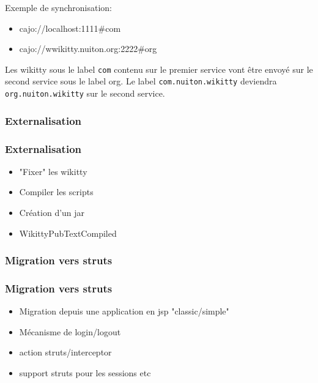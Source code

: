 \documentclass[12pt,a4paper,utf8x]{beamer}
\begin{document}
\begin{frame}
Exemple de synchronisation:
\begin{itemize}
\item cajo://localhost:1111\#com
\item cajo://wwikitty.nuiton.org:2222\#org
\end{itemize}
\vspace{5mm}
Les wikitty sous le label \verb!com! contenu sur le premier service vont
être envoyé sur le second service sous le label org.
\vspace{5mm}
Le label \verb!com.nuiton.wikitty! deviendra \verb!org.nuiton.wikitty! sur 
le second service.
\end{frame}

\subsubsection*{Externalisation}
\begin{frame}\frametitle{Externalisation}
\begin{itemize}
\item "Fixer" les wikitty
\item Compiler les scripts
\item Création d'un jar
\item WikittyPubTextCompiled
\end{itemize}
\end{frame}

\subsubsection*{Migration vers struts}
\begin{frame}\frametitle{Migration vers struts}
\begin{itemize}
\item Migration depuis une application en jsp "classic/simple"
\item Mécanisme de login/logout
\item action struts/interceptor
\item support struts pour les sessions etc
\end{itemize}
\end{frame}
\end{document}
